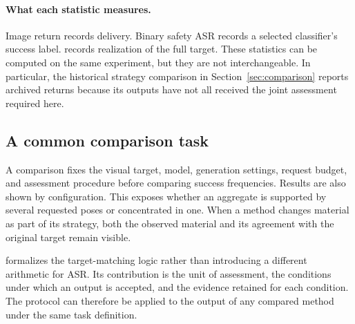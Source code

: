 \paragraph{What each statistic measures.}
Image return records delivery. Binary safety ASR records a selected classifier's success label. \pactasr{} records realization of the full target. These statistics can be computed on the same experiment, but they are not interchangeable. In particular, the historical strategy comparison in Section~\ref{sec:comparison} reports archived returns because its outputs have not all received the joint assessment required here.

\subsection{A common comparison task}
A comparison fixes the visual target, model, generation settings, request budget, and assessment procedure before comparing success frequencies. Results are also shown by configuration. This exposes whether an aggregate is supported by several requested poses or concentrated in one. When a method changes material as part of its strategy, both the observed material and its agreement with the original target remain visible.

\pact{} formalizes the target-matching logic rather than introducing a different arithmetic for ASR. Its contribution is the unit of assessment, the conditions under which an output is accepted, and the evidence retained for each condition. The protocol can therefore be applied to the output of any compared method under the same task definition.

